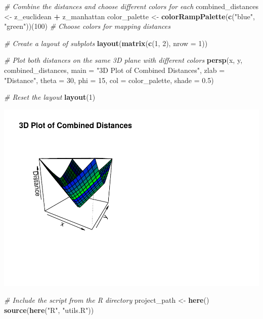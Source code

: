 \documentclass[
]{article}
\newenvironment{Shaded}{\begin{snugshade}}{\end{snugshade}}
\newcommand{\AttributeTok}[1]{\textcolor[rgb]{0.13,0.29,0.53}{#1}}
\newcommand{\CommentTok}[1]{\textcolor[rgb]{0.56,0.35,0.01}{\textit{#1}}}
\newcommand{\DecValTok}[1]{\textcolor[rgb]{0.00,0.00,0.81}{#1}}
\newcommand{\FloatTok}[1]{\textcolor[rgb]{0.00,0.00,0.81}{#1}}
\newcommand{\FunctionTok}[1]{\textcolor[rgb]{0.13,0.29,0.53}{\textbf{#1}}}
\newcommand{\NormalTok}[1]{#1}
\newcommand{\OtherTok}[1]{\textcolor[rgb]{0.56,0.35,0.01}{#1}}
\newcommand{\SpecialCharTok}[1]{\textcolor[rgb]{0.81,0.36,0.00}{\textbf{#1}}}
\newcommand{\StringTok}[1]{\textcolor[rgb]{0.31,0.60,0.02}{#1}}
\begin{document}
\begin{Shaded}
\begin{Highlighting}[]
\CommentTok{\# Combine the distances and choose different colors for each}
\NormalTok{combined\_distances }\OtherTok{\textless{}{-}}\NormalTok{ z\_euclidean }\SpecialCharTok{+}\NormalTok{ z\_manhattan}
\NormalTok{color\_palette }\OtherTok{\textless{}{-}} \FunctionTok{colorRampPalette}\NormalTok{(}\FunctionTok{c}\NormalTok{(}\StringTok{"blue"}\NormalTok{, }\StringTok{"green"}\NormalTok{))(}\DecValTok{100}\NormalTok{)  }\CommentTok{\# Choose colors for mapping distances}

\CommentTok{\# Create a layout of subplots}
\FunctionTok{layout}\NormalTok{(}\FunctionTok{matrix}\NormalTok{(}\FunctionTok{c}\NormalTok{(}\DecValTok{1}\NormalTok{, }\DecValTok{2}\NormalTok{), }\AttributeTok{nrow =} \DecValTok{1}\NormalTok{))}

\CommentTok{\# Plot both distances on the same 3D plane with different colors}
\FunctionTok{persp}\NormalTok{(x, y, combined\_distances,}
      \AttributeTok{main =} \StringTok{"3D Plot of Combined Distances"}\NormalTok{,}
      \AttributeTok{zlab =} \StringTok{"Distance"}\NormalTok{,}
      \AttributeTok{theta =} \DecValTok{30}\NormalTok{, }\AttributeTok{phi =} \DecValTok{15}\NormalTok{,}
      \AttributeTok{col =}\NormalTok{ color\_palette, }\AttributeTok{shade =} \FloatTok{0.5}\NormalTok{)}

\CommentTok{\# Reset the layout}
\FunctionTok{layout}\NormalTok{(}\DecValTok{1}\NormalTok{)}
\end{Highlighting}
\end{Shaded}

\includegraphics{week1_files/figure-latex/unnamed-chunk-5-1.pdf}

\begin{Shaded}
\begin{Highlighting}[]
\CommentTok{\# Include the script from the R directory}
\NormalTok{project\_path }\OtherTok{\textless{}{-}} \FunctionTok{here}\NormalTok{()}
\FunctionTok{source}\NormalTok{(}\FunctionTok{here}\NormalTok{(}\StringTok{"R"}\NormalTok{, }\StringTok{"utils.R"}\NormalTok{))}
\end{Highlighting}
\end{Shaded}
\end{document}
